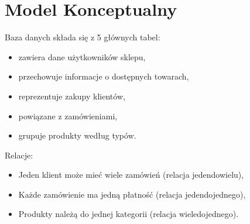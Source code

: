\documentclass[letterpaper,10pt,english]{sphinxmanual}
\begin{document}
\section{Model Konceptualny}
\label{\detokenize{rozdzial3/index:model-konceptualny}}
\sphinxAtStartPar
Baza danych składa się z 5 głównych tabel:
\begin{itemize}
\item {} 
\sphinxAtStartPar
{} \textendash{} zawiera dane użytkowników sklepu,

\item {} 
\sphinxAtStartPar
{} \textendash{} przechowuje informacje o dostępnych towarach,

\item {} 
\sphinxAtStartPar
{} \textendash{} reprezentuje zakupy klientów,

\item {} 
\sphinxAtStartPar
{} \textendash{} powiązane z zamówieniami,

\item {} 
\sphinxAtStartPar
{} \textendash{} grupuje produkty według typów.

\end{itemize}

\sphinxAtStartPar
Relacje:
\begin{itemize}
\item {} 
\sphinxAtStartPar
Jeden klient może mieć wiele zamówień (relacja jeden\sphinxhyphen{}do\sphinxhyphen{}wielu),

\item {} 
\sphinxAtStartPar
Każde zamówienie ma jedną płatność (relacja jeden\sphinxhyphen{}do\sphinxhyphen{}jednego),

\item {} 
\sphinxAtStartPar
Produkty należą do jednej kategorii (relacja wiele\sphinxhyphen{}do\sphinxhyphen{}jednego).

\end{itemize}
\end{document}
